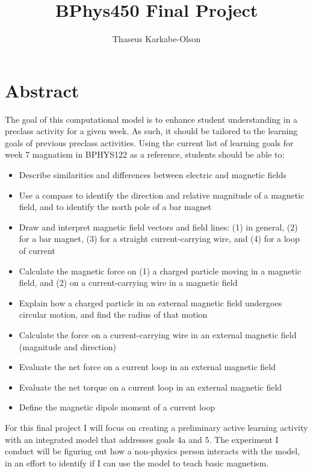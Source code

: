 \documentclass[11pt]{article}
\title{BPhys450 Final Project}
\author{Thaseus Karkabe-Olson}
\date{}
\begin{document}
	\maketitle

    \raggedright
    
    \section*{Abstract}

        The goal of this computational model is to enhance student understanding in a preclass activity for a given week. As such, it should be tailored to the learning goals of previous preclass activities. Using the current list of learning goals for week 7 magnatism in BPHYS122 as a reference, students should be able to:

        \begin{itemize}

            \item Describe similarities and differences between electric and magnetic fields
            \item Use a compass to identify the direction and relative magnitude of a magnetic field, and to identify the north pole of a bar magnet
            \item Draw and interpret magnetic field vectors and field lines: (1) in general, (2) for a bar magnet, (3) for a straight current-carrying wire, and (4) for a loop of current
            \item Calculate the magnetic force on (1) a charged particle moving in a magnetic field, and (2) on a current-carrying wire in a magnetic field
            \item Explain how a charged particle in an external magnetic field undergoes circular motion, and find the radius of that motion
            \item Calculate the force on a current-carrying wire in an external magnetic field (magnitude and direction)
            \item Evaluate the net force on a current loop in an external magnetic field
            \item Evaluate the net torque on a current loop in an external magnetic field
            \item Define the magnetic dipole moment of a current loop

        \end{itemize}

        For this final project I will focus on creating a preliminary active learning activity with an integrated model that addresses goals 4a and 5. The experiment I conduct will be figuring out how a non-physics person interacts with the model, in an effort to identify if I can use the model to teach basic magnetism.
        
\end{document}
